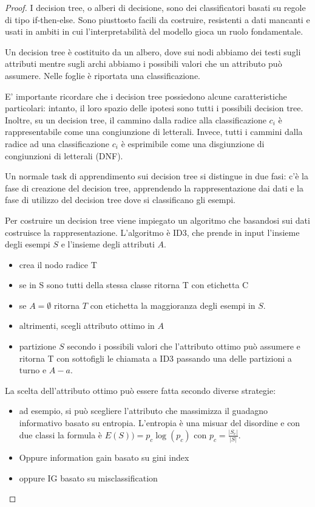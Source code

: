 \documentclass[12pt,a4paper,oneside]{book}
\begin{document}
\begin{proof}
	I decision tree, o alberi di decisione, sono dei classificatori basati su regole di tipo if-then-else. Sono piusttosto facili da costruire, resistenti a dati mancanti e usati in ambiti in cui l'interpretabilità del modello gioca un ruolo fondamentale.
	
	Un decision tree è costituito da un albero, dove sui nodi abbiamo dei testi sugli attributi mentre sugli archi abbiamo i possibili valori che un attributo può assumere. Nelle foglie è riportata una classificazione.
	
	E' importante ricordare che i decision tree possiedono alcune caratteristiche particolari: intanto, il loro spazio delle ipotesi sono tutti i possibili decision tree. Inoltre, su un decision tree, il cammino dalla radice alla classificazione $c_i$ è rappresentabile come una congiunzione di letterali. Invece, tutti i cammini dalla radice ad una classificazione $c_i$ è esprimibile come una disgiunzione di congiunzioni di letterali (DNF).
	
	Un normale task di apprendimento sui decision tree si distingue in due fasi: c'è la fase di creazione del decision tree, apprendendo la rappresentazione dai dati e la fase di utilizzo del decision tree dove si classificano gli esempi.
	
	Per costruire un decision tree viene impiegato un algoritmo che basandosi sui dati costruisce la rappresentazione. L'algoritmo è ID3, che prende in input l'insieme degli esempi $S$ e l'insieme degli attributi $A$.
	\begin{itemize}
		\item crea il nodo radice T
		\item se in S sono tutti della stessa classe ritorna T con etichetta C
		\item se $A=\emptyset$ ritorna $T$ con etichetta la maggioranza degli esempi in $S$.
		\item altrimenti, scegli attributo ottimo in $A$
		\item partizione $S$ secondo i possibili valori che l'attributo ottimo può assumere e ritorna T con sottofigli le chiamata a ID3 passando una delle partizioni a turno e $A - a$.
	\end{itemize}

	La scelta dell'attributo ottimo può essere fatta secondo diverse strategie:
	\begin{itemize}
		\item ad esempio, si può scegliere l'attributo che massimizza il guadagno informativo basato su entropia. L'entropia è una misuar del disordine e con due classi la formula è $E(S)) = p_c \log(p_c)$ con $p_c = \frac{|S_c|}{|S|}$. 
		\item Oppure information gain basato su gini index
		\item oppure IG basato su misclassification
	\end{itemize}
\end{proof}
\end{document}
